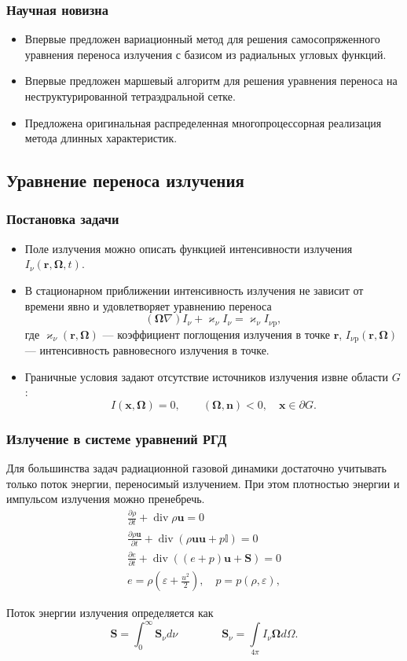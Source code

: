 \documentclass[unicode,aspectratio=43]{beamer}
\newcommand{\I}{\mathrm{\mathit{I}}}
\renewcommand{\vec}[1]{\boldsymbol{\mathbf{#1}}}
\newcommand{\pd}[2]{\frac{\partial #1}{\partial #2}}
\renewcommand{\div}{\operatorname{div}}
\begin{document}
\begin{frame}\frametitle{Научная новизна}
	\begin{itemize}
	\item Впервые предложен вариационный метод для решения самосопряженного уравнения переноса излучения с базисом из радиальных угловых функций.
	\item Впервые предложен маршевый алгоритм для решения уравнения переноса на неструктурированной тетраэдральной сетке.
	\item Предложена оригинальная распределенная многопроцессорная реализация метода длинных характеристик.
	\end{itemize}
\end{frame}

\subsection{Уравнение переноса излучения}

\begin{frame}\frametitle{Постановка задачи}
	\begin{itemize}
	\item Поле излучения можно описать функцией интенсивности излучения $\I_\nu(\vec r,
\vec \Omega, t)$.
	\item В стационарном приближении интенсивность излучения не зависит от времени явно и
удовлетворяет уравнению переноса
	\[
		(\vec \Omega \nabla) \I_\nu + \varkappa_\nu \I_\nu = \varkappa_\nu \I_{\nu\text{p}},
	\]
	где $\varkappa_\nu(\vec r, \vec \Omega)$ --- коэффициент поглощения излучения в точке $\vec
r$, $\I_{\nu\text{p}}(\vec r, \vec \Omega)$ --- интенсивность равновесного излучения в точке.
	\item Граничные условия задают отсутствие источников излучения извне
области $G$:
	\[
		\I(\vec x, \vec \Omega) = 0, \qquad (\vec \Omega, \vec n) < 0, \quad
\vec x \in \partial G.
	\]
	\end{itemize}
\end{frame}

\begin{frame}\frametitle{Излучение в системе уравнений РГД}
	Для большинства задач радиационной газовой динамики достаточно учитывать только поток энергии, переносимый излучением. При этом плотностью энергии и импульсом излучения можно пренебречь.
	\[
	\begin{gathered}
	\pd{\rho}{t} + \div \rho \vec u = 0\\
	\pd{\rho \vec u}{t} + \div \left(\rho \vec u \vec u + p \mathbb I\right) = 0\\
	\pd{e}{t} + \div \left((e + p)\vec u + \vec S \right) = 0\\
	e = \rho \left(\varepsilon + \frac{u^2}{2}\right),\quad  p = p(\rho, \varepsilon),
	\end{gathered}
	\]

	Поток энергии излучения определяется как
	\[
	\vec S = \int_0^\infty \vec S_\nu d\nu \qquad\qquad
	\vec S_\nu = \int\limits_{4\pi} \I_\nu \vec \Omega d\Omega.
	\]
\end{frame}
\end{document}
